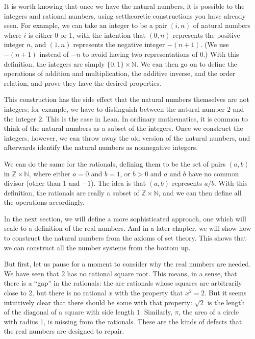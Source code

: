 \documentclass[letterpaper,10pt,english]{sphinxmanual}
\begin{document}
\sphinxAtStartPar
It is worth knowing that once we have the natural numbers, it is possible to  the integers and rational numbers, using set\sphinxhyphen{}theoretic constructions you have already seen. For example, we can take an integer to be a pair \((i, n)\) of natural numbers where \(i\) is either 0 or 1, with the intention that \((0, n)\) represents the positive integer \(n\), and \((1, n)\) represents the negative integer \(-(n+1)\). (We use \(-(n+1)\) instead of \(-n\) to avoid having two representations of \(0\).) With this definition, the integers are simply \(\{0, 1\} \times \mathbb{N}\). We can then go on to define the operations of addition and multiplication, the additive inverse, and the order relation, and prove they have the desired properties.

\sphinxAtStartPar
This construction has the side effect that the natural numbers themselves are not integers; for example, we have to distinguish between the natural number \(2\) and the integer \(2\). This is the case in Lean. In ordinary mathematics, it is common to think of the natural numbers as a subset of the integers. Once we construct the integers, however, we can throw away the old version of the natural numbers, and afterwards identify the natural numbers as nonnegative integers.

\sphinxAtStartPar
We can do the same for the rationals, defining them to be the set of pairs \((a, b)\) in \(\mathbb{Z} \times \mathbb{N}\), where either \(a = 0\) and \(b = 1\), or \(b > 0\) and \(a\) and \(b\) have no common divisor (other than \(1\) and \(-1\)). The idea is that \((a, b)\) represents \(a / b\). With this definition, the rationals are really a subset of \(\mathbb{Z} \times \mathbb{N}\), and we can then define all the operations accordingly.

\sphinxAtStartPar
In the next section, we will define a more sophisticated approach, one which will scale to a definition of the real numbers. And in a later chapter, we will show how to construct the natural numbers from the axioms of set theory. This shows that we can construct all the number systems from the bottom up.

\sphinxAtStartPar
But first, let us pause for a moment to consider why the real numbers are needed. We have seen that \(2\) has no rational square root. This means, in a sense, that there is a “gap” in the rationals: the are rationals whose squares are arbitrarily close to 2, but there is no rational \(x\) with the property that \(x^2 = 2\). But it seems intuitively clear that there should be some  with that property: \(\sqrt{2}\) is the length of the diagonal of a square with side length \(1\). Similarly, \(\pi\), the area of a circle with radius 1, is missing from the rationals. These are the kinds of defects that the real numbers are designed to repair.
\end{document}
